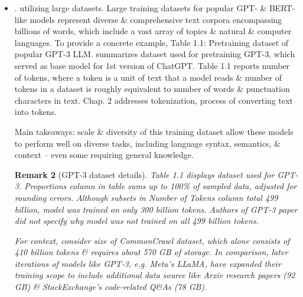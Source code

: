 \documentclass{article}
\newtheorem{remark}{Remark}
\begin{document}
\begin{itemize}
\begin{itemize}
\begin{remark}[Transformers vs. LLMs]
			-- LLM ngày nay dựa trên kiến trúc máy biến áp. Do đó, máy biến áp \& LLM là những thuật ngữ thường được sử dụng đồng nghĩa trong tài liệu. Tuy nhiên, lưu ý: không phải tất cả máy biến áp đều là LLM vì máy biến áp cũng có thể được sử dụng cho thị giác máy tính. Ngoài ra, không phải tất cả LLM đều là máy biến áp, vì có những LLM dựa trên kiến trúc hồi quy \& tích chập. Động lực chính đằng sau các phương pháp tiếp cận thay thế này: cải thiện hiệu quả tính toán của LLM. Liệu các kiến trúc LLM thay thế này có thể cạnh tranh với khả năng của LLM dựa trên máy biến áp \& liệu chúng có được áp dụng trong thực tế hay không vẫn còn phải chờ xem. Để đơn giản, hãy sử dụng thuật ngữ ``LLM'' để chỉ các LLM dựa trên máy biến áp tương tự như GPT. (Những độc giả quan tâm có thể tìm thấy tài liệu tham khảo mô tả các kiến trúc này trong Phụ lục B.)
		\end{remark}		
		\item {. utilizing large datasets.} Large training datasets for popular GPT- \& BERT-like models represent diverse \& comprehensive text corpora encompassing billions of words, which include a vast array of topics \& natural \& computer languages. To provide a concrete example, {\sf Table 1.1: Pretraining dataset of popular GPT-3 LLM.} summarizes dataset used for pretraining GPT-3, which served as base model for 1st version of ChatGPT. Table 1.1 reports number of tokens, where a token is a unit of text that a model reads \& number of tokens in a dataset is roughly equivalent to number of words \& punctuation characters in text. Chap. 2 addresses tokenization, process of converting text into tokens.
		
		Main takeaways: scale \& diversity of this training dataset allow these models to perform well on diverse tasks, including language syntax, semantics, \& context -- even some requiring general knowledge.
		\begin{remark}[GPT-3 dataset details]
			Table 1.1 displays dataset used for GPT-3. Proportions column in table sums up to 100\% of sampled data, adjusted for rounding errors. Although subsets in Number of Tokens column total 499 billion, model was trained on only 300 billion tokens. Authors of GPT-3 paper did not specify why model was not trained on all 499 billion tokens.
			
			For context, consider size of CommonCrawl dataset, which alone consists of 410 billion tokens \& requires about 570 GB of storage. In comparison, later iterations of models like GPT-3, e.g. Meta's LLaMA, have expanded their training scope to include additional data source like Arxiv research papers (92 GB) \& StackExchange's code-related Q\&As (78 GB).
			

\end{remark}
\end{itemize}
\end{itemize}
\end{document}
